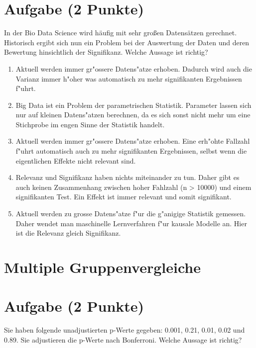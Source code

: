 \documentclass[a4paper, 9pt]{scrartcl}\usepackage[]{graphicx}\usepackage[]{xcolor}
\begin{document}
\section{Aufgabe \hfill (2 Punkte)}

In der Bio Data Science wird h{\"a}ufig mit sehr gro{\ss}en Datens{\"a}tzen
gerechnet. Historisch ergibt sich nun ein Problem bei der Auswertung der
Daten und deren Bewertung hinsichtlich der Signifikanz. Welche Aussage ist richtig?



\begin{enumerate}
\item [\textbf{A} \msquare] Aktuell werden immer gr{"o}ssere Datens{"a}tze erhoben. Dadurch wird auch die Varianz immer h{"o}her was automatisch zu mehr signifikanten Ergebnissen f{"u}hrt.
\item [\textbf{B} \msquare] Big Data ist ein Problem der parametrischen Statistik. Parameter lassen sich nur auf kleinen Datens{"a}tzen berechnen, da es sich sonst nicht mehr um eine Stichprobe im engen Sinne der Statistik handelt.
\item [\textbf{C} \msquare] Aktuell werden immer gr{"o}ssere Datens{"a}tze erhoben. Eine erh{"o}hte Fallzahl f{"u}hrt automatisch auch zu mehr signifikanten Ergebnissen, selbst wenn die eigentlichen Effekte nicht relevant sind.
\item [\textbf{D} \msquare] Relevanz und Signifikanz haben nichts miteinander zu tun. Daher gibt es auch keinen Zusammenhang zwischen hoher Fahlzahl (n > 10000) und einem signifikanten Test. Ein Effekt ist immer relevant und somit signifikant.
\item [\textbf{E} \msquare] Aktuell werden zu grosse Datens{"a}tze f{"u}r die g{"a}nigige Statistik gemessen. Daher wendet man maschinelle Lernverfahren f{"u}r kausale Modelle an. Hier ist die Relevanz gleich Signifikanz.
\end{enumerate}
\section*{Multiple Gruppenvergleiche}    

\section{Aufgabe \hfill (2 Punkte)}



Sie haben folgende unadjustierten p-Werte gegeben: 0.001, 0.21, 0.01, 0.02 und 0.89. Sie adjustieren die p-Werte nach
Bonferroni. Welche Aussage ist richtig?
\end{document}
